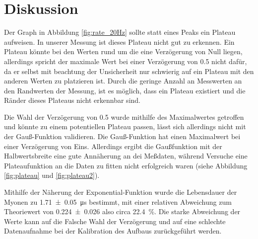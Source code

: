 \section{Diskussion}
\label{sec:Diskussion}

Der Graph in Abbildung \ref{fig:rate_20Hz} sollte statt eines Peaks ein Plateau aufweisen.
In unserer Messung ist dieses Plateau nicht gut zu erkennen.
Ein Plateau könnte bei den Werten rund um die eine Verzögerung von Null liegen, allerdings spricht der maximale Wert bei einer Verzögerung von \num{0.5} nicht dafür, da er selbst mit beachtung der Unsicherheit nur schwierig auf ein Plateau mit den anderen Werten zu platzieren ist.
Durch die geringe Anzahl an Messwerten an den Randwerten der Messung, ist es möglich, dass ein Plateau existiert und die Ränder dieses Plateaus nicht erkennbar sind.

Die Wahl der Verzögerung von \num{0.5} wurde mithilfe des Maximalwertes getroffen und könnte zu einem potentiellen Plateau passen, lässt sich allerdings nicht mit der Gauß-Funktion validieren.
Die Gauß-Funktion hat einen Maximalwert bei einer Verzögerung von Eins. Allerdings ergibt die Gaußfunktion mit der Halbwertsbreite eine gute Annäherung an dei Meßdaten, während Versuche eine Plateaufunktion an die Daten zu fitten nicht erfolgreich waren (siehe Abbildung \ref{fig:plateau} und \ref{fig:plateau2}).

Mithilfe der Näherung der Exponential-Funktion wurde die Lebensdauer der Myonen zu \SI{1.71+-0.05}{\micro\second} bestimmt, mit einer relativen Abweichung zum Theoriewert von \num{0.224 +- 0.026} also circa \SI{22.4}{\percent}.
Die starke Abweichung der Werte kann auf die Falsche Wahl der Verzögerung und auf eine schlechte Datenaufnahme bei der Kalibration des Aufbaus zurückgeführt werden.